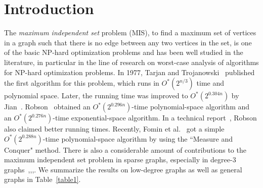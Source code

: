 \documentclass[runningheads]{llncs}
\begin{document}
\section{Introduction}\label{sec_intr}
The \emph{maximum independent set} problem (MIS), to find a
maximum set of vertices in a graph such that there is no edge
between any two vertices in the set, is one of the basic NP-hard
optimization problems and has been well studied in the literature,
in particular in the line of research on worst-case analysis of
algorithms for NP-hard optimization problems. In 1977, Tarjan and
Trojanowski~\cite{Tarjan:IS} published the first algorithm for
this problem, which runs in $O^*(2^{n/3})$ time and polynomial
space. Later, the running time was improved to $O^*(2^{0.304n})$
by Jian~\cite{Jian:Is}. Robson~\cite{Robson:IS} obtained an
$O^*(2^{0.296n})$-time polynomial-space algorithm and an
$O^*(2^{0.276n})$-time exponential-space algorithm. In a technical
report~\cite{Robson:IS_1}, Robson also claimed better running
times. Recently, Fomin et al.~\cite{Fomin:is} got a simple
$O^*(2^{0.288n})$-time polynomial-space algorithm by using the
``Measure and Conquer" method. There is also a considerable amount
of contributions to the maximum independent set problem in sparse
graphs, especially in degree-$3$
graphs~\cite{Beigel:is},\cite{Chen:labeled3vc},\cite{xiao:IS3},\cite{Bourgeois:3IS}.
We summarize the results on low-degree graphs as well as general
graphs in Table~\ref{table1}.
\end{document}
